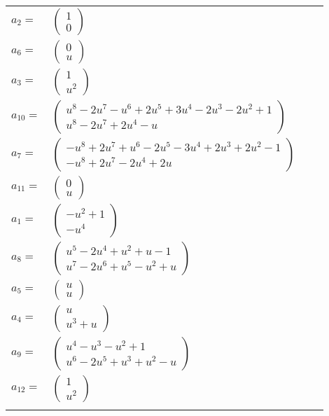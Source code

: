 \documentclass[1p]{elsarticle_modified}
\theoremstyle{definition}
\begin{document}
\begin{tabular}{m{7pt} m{180pt} m{7pt} m{180pt} }
\flushright $a_{2}=$&$\begin{pmatrix}1\\0\end{pmatrix}$ \\
\flushright $a_{6}=$&$\begin{pmatrix}0\\u\end{pmatrix}$ \\
\flushright $a_{3}=$&$\begin{pmatrix}1\\u^2\end{pmatrix}$ \\
\flushright $a_{10}=$&$\begin{pmatrix}u^8-2 u^7- u^6+2 u^5+3 u^4-2 u^3-2 u^2+1\\u^8-2 u^7+2 u^4- u\end{pmatrix}$ \\
\flushright $a_{7}=$&$\begin{pmatrix}- u^8+2 u^7+u^6-2 u^5-3 u^4+2 u^3+2 u^2-1\\- u^8+2 u^7-2 u^4+2 u\end{pmatrix}$ \\
\flushright $a_{11}=$&$\begin{pmatrix}0\\u\end{pmatrix}$ \\
\flushright $a_{1}=$&$\begin{pmatrix}- u^2+1\\- u^4\end{pmatrix}$ \\
\flushright $a_{8}=$&$\begin{pmatrix}u^5-2 u^4+u^2+u-1\\u^7-2 u^6+u^5- u^2+u\end{pmatrix}$ \\
\flushright $a_{5}=$&$\begin{pmatrix}u\\u\end{pmatrix}$ \\
\flushright $a_{4}=$&$\begin{pmatrix}u\\u^3+u\end{pmatrix}$ \\
\flushright $a_{9}=$&$\begin{pmatrix}u^4- u^3- u^2+1\\u^6-2 u^5+u^3+u^2- u\end{pmatrix}$ \\
\flushright $a_{12}=$&$\begin{pmatrix}1\\u^2\end{pmatrix}$\\&\end{tabular}
\end{document}
